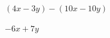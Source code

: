 
\question $(4x - 3y) - (10x - 10y)$

  \begin{solutionorlines}[2cm]
    $-6x + 7y$
  \end{solutionorlines}
